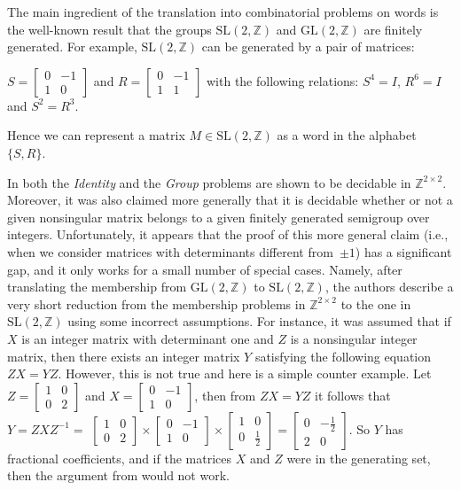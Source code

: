 \documentclass[fontsize=11pt,DIV=13,paper=letter]{scrartcl}
\theoremstyle{definition}
\newcommand{\Z}{\mathbb{Z}}
\newcommand{\SL}{\mathrm{SL}(2,\Z)}
\newcommand{\GL}{\mathrm{GL}(2,\Z)}
\begin{document}
The main ingredient of the translation into combinatorial problems on words is the well-known result that the groups $\SL$ and $\GL$ are finitely generated. For example, $\SL$ can be generated by a pair of matrices: 
\begin{center}
$S = \begin{bmatrix}
0 & -1 \\ 1 & 0
\end{bmatrix}
$ and
$R = \begin{bmatrix}
0 & -1 \\ 1 & 1
\end{bmatrix}
$
with the following relations: $S^4=I$, $R^6=I$ and $S^2=R^3$.
\end{center}
Hence we can represent a matrix $M\in \SL$ as a word in the alphabet $\{S,R\}$.


In \cite{CK2005} both the {\sl Identity} and the {\sl Group} problems are shown to be decidable in  $\Z^{2 \times 2}$. 
Moreover, it was also claimed more generally
that it is decidable whether or not a given nonsingular matrix belongs to a given finitely generated semigroup over integers.
Unfortunately, it appears that the proof of this more general claim (i.e., when we consider matrices with determinants different from~$\pm 1$) has a significant gap,
and it only works for a small number of special cases. Namely, after translating the membership from $\GL$ to $\SL$, the authors describe a very short reduction 
from the membership problems in $\Z^{2 \times 2}$ to the one in $\SL$ using some incorrect assumptions.
For instance, it was assumed that if $X$ is an integer matrix with determinant one and $Z$ is a nonsingular integer matrix, then 
there exists an integer matrix $Y$ satisfying the following equation  $ZX=YZ$. However, this is not true and here is a simple counter example.
Let $Z = \begin{bmatrix}
1 & 0 \\ 0 & 2
\end{bmatrix}
$ and $X = \begin{bmatrix}
0 & -1 \\ 1 & 0
\end{bmatrix}
$, then from $ZX=YZ$ it follows that 
$Y = Z X Z^{-1} =$
$
\begin{bmatrix}
1 & 0 \\ 0 & 2
\end{bmatrix}
 \times
\begin{bmatrix}
0 & -1 \\ 1 & 0
\end{bmatrix}
 \times
\begin{bmatrix}
1 & 0 \\ 0 & \frac{1}{2}
\end{bmatrix}
=
\begin{bmatrix}
0 & -\frac{1}{2} \\ 2 & 0
\end{bmatrix}
$. So $Y$ has fractional coefficients, and if the matrices $X$ and $Z$ were in the generating set, then the argument from \cite{CK2005} would not work.
\end{document}
